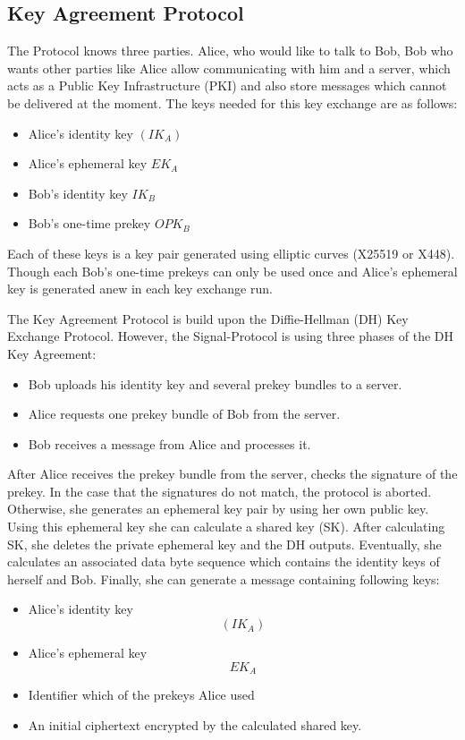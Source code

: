 \documentclass[12pt,oneside,a4paper,parskip]{scrbook}
\begin{document}
\subsection{Key Agreement Protocol}
The Protocol knows three parties. Alice, who would like to talk to Bob, Bob who wants other parties like Alice allow communicating with him and a server, which acts as a
Public Key Infrastructure (PKI) and also store messages which cannot be delivered at the moment. The keys needed for this key exchange are as follows:
\begin{itemize}
  \item Alice's identity key $   (IK_{A})  $
  \item Alice's ephemeral key $   {EK_{A}}  $
  \item Bob's identity key $   {IK_{B}}  $ 
  \item Bob's one-time prekey $   {OPK_{B}}  $
\end{itemize}

Each of these keys is a key pair generated using elliptic curves (X25519 or X448). Though each Bob's one-time prekeys can only be used once and Alice's ephemeral key is generated anew in each key exchange run.

The Key Agreement Protocol is build upon the Diffie-Hellman (DH) Key Exchange Protocol. However, the Signal-Protocol is using three phases of the DH Key Agreement:
\begin{itemize}
  \item Bob uploads his identity key and several prekey bundles to a server.
  \item Alice requests one prekey bundle of Bob from the server.
  \item Bob receives a message from Alice and processes it.
\end{itemize}

After Alice receives the prekey bundle from the server, checks the signature of the prekey. In the case that the signatures do not match, the protocol is aborted.
Otherwise, she generates an ephemeral key pair by using her own public key. Using this ephemeral key she can calculate a shared key (SK). After calculating SK, she deletes the private ephemeral key and the DH outputs. Eventually, she calculates an associated data byte sequence which contains the identity keys of herself and Bob.
Finally, she can generate a message containing following keys:
\begin{itemize}
  \item Alice's identity key  \[  (IK_{A}) \]
  \item Alice's ephemeral key \[  {EK_{A}} \] 
  \item Identifier which of the prekeys Alice used
  \item An initial ciphertext encrypted by the calculated shared key.
\end{itemize}
\end{document}

